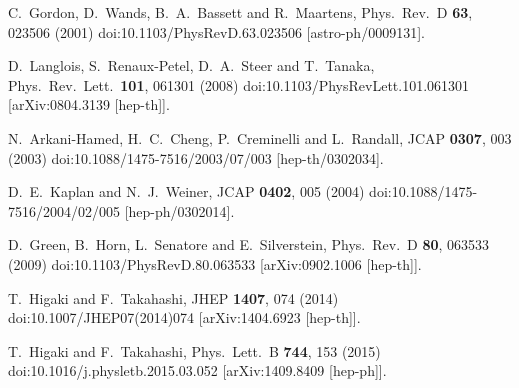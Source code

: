 \documentclass[a4paper,11pt]{article}
\begin{document}
\begin{thebibliography}{99}
  C.~Gordon, D.~Wands, B.~A.~Bassett and R.~Maartens,
  Phys.\ Rev.\ D {\bf 63}, 023506 (2001)
  doi:10.1103/PhysRevD.63.023506
  [astro-ph/0009131].


  D.~Langlois, S.~Renaux-Petel, D.~A.~Steer and T.~Tanaka,
  Phys.\ Rev.\ Lett.\  {\bf 101}, 061301 (2008)
  doi:10.1103/PhysRevLett.101.061301
  [arXiv:0804.3139 [hep-th]].


  N.~Arkani-Hamed, H.~C.~Cheng, P.~Creminelli and L.~Randall,
  JCAP {\bf 0307}, 003 (2003)
  doi:10.1088/1475-7516/2003/07/003
  [hep-th/0302034].


  D.~E.~Kaplan and N.~J.~Weiner,
  JCAP {\bf 0402}, 005 (2004)
  doi:10.1088/1475-7516/2004/02/005
  [hep-ph/0302014].


  D.~Green, B.~Horn, L.~Senatore and E.~Silverstein,
  Phys.\ Rev.\ D {\bf 80}, 063533 (2009)
  doi:10.1103/PhysRevD.80.063533
  [arXiv:0902.1006 [hep-th]].


  T.~Higaki and F.~Takahashi,
  JHEP {\bf 1407}, 074 (2014)
  doi:10.1007/JHEP07(2014)074
  [arXiv:1404.6923 [hep-th]].


  T.~Higaki and F.~Takahashi,
  Phys.\ Lett.\ B {\bf 744}, 153 (2015)
  doi:10.1016/j.physletb.2015.03.052
  [arXiv:1409.8409 [hep-ph]].



\end{thebibliography}
\end{document}
